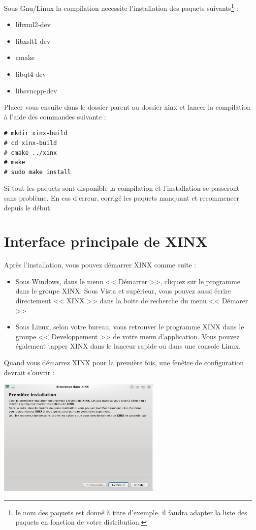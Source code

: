 \documentclass[a4paper,10pt,twoside]{book}
\begin{document}
Sous Gnu/Linux la compilation necessite l'installation des paquets suivants\footnote{le nom des paquets est donné à titre d'exemple, il faudra adapter la liste des paquets en fonction de votre distribution.} :
\begin{itemize}
 \item libxml2-dev
 \item libxslt1-dev
 \item cmake
 \item libqt4-dev
 \item libsvncpp-dev 
\end{itemize}

Placer vous ensuite dans le dossier parent au dossier xinx et lancer la compilation à l'aide des commandes suivante :
\begin{verbatim}
# mkdir xinx-build
# cd xinx-build
# cmake ../xinx
# make
# sudo make install
\end{verbatim}

Si tout les paquets sont disponible la compilation et l'installation se passeront sans problème. En cas d'erreur, corrigé les paquets manquant et recommencer depuis le début.

\chapter{Interface principale de XINX}

Après l'installation, vous pouvez démarrer XINX comme suite :
\begin{itemize}
 \item Sous Windows, dans le menu << Démarrer >>, cliquez sur le programme dans le groupe XINX. Sous Vista et supérieur, vous pouvez aussi écrire directement << XINX >> dans la boite de recherche du menu << Démarer >>
 \item Sous Linux, selon votre bureau, vous retrouver le programme XINX dans le groupe << Developpement >> de votre menu d'application. Vous pouvez également tapper XINX dans le lanceur rapide ou dans une console Linux. 
\end{itemize}

Quand vous démarrez XINX pour la première fois, une fenêtre de configuration devrait s'ouvrir :

\begin{center}
 \includegraphics[width=0.60\textwidth]{./firstinstall1.png}
\end{center}
\end{document}
